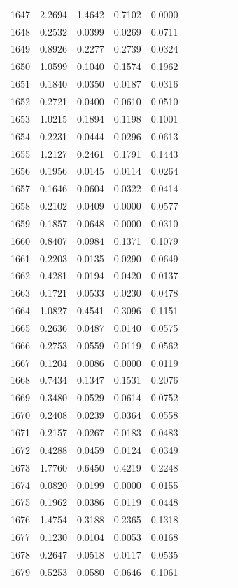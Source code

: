 \begin{table}
\begin{tabular}{cccccccccc}
1647& 2.2694& 1.4642& 0.7102& 0.0000\\ 
1648& 0.2532& 0.0399& 0.0269& 0.0711\\ 
1649& 0.8926& 0.2277& 0.2739& 0.0324\\ 
1650& 1.0599& 0.1040& 0.1574& 0.1962\\ 
1651& 0.1840& 0.0350& 0.0187& 0.0316\\ 
1652& 0.2721& 0.0400& 0.0610& 0.0510\\ 
1653& 1.0215& 0.1894& 0.1198& 0.1001\\ 
1654& 0.2231& 0.0444& 0.0296& 0.0613\\ 
1655& 1.2127& 0.2461& 0.1791& 0.1443\\ 
1656& 0.1956& 0.0145& 0.0114& 0.0264\\ 
1657& 0.1646& 0.0604& 0.0322& 0.0414\\ 
1658& 0.2102& 0.0409& 0.0000& 0.0577\\ 
1659& 0.1857& 0.0648& 0.0000& 0.0310\\ 
1660& 0.8407& 0.0984& 0.1371& 0.1079\\ 
1661& 0.2203& 0.0135& 0.0290& 0.0649\\ 
1662& 0.4281& 0.0194& 0.0420& 0.0137\\ 
1663& 0.1721& 0.0533& 0.0230& 0.0478\\ 
1664& 1.0827& 0.4541& 0.3096& 0.1151\\ 
1665& 0.2636& 0.0487& 0.0140& 0.0575\\ 
1666& 0.2753& 0.0559& 0.0119& 0.0562\\ 
1667& 0.1204& 0.0086& 0.0000& 0.0119\\ 
1668& 0.7434& 0.1347& 0.1531& 0.2076\\ 
1669& 0.3480& 0.0529& 0.0614& 0.0752\\ 
1670& 0.2408& 0.0239& 0.0364& 0.0558\\ 
1671& 0.2157& 0.0267& 0.0183& 0.0483\\ 
1672& 0.4288& 0.0459& 0.0124& 0.0349\\ 
1673& 1.7760& 0.6450& 0.4219& 0.2248\\ 
1674& 0.0820& 0.0199& 0.0000& 0.0155\\ 
1675& 0.1962& 0.0386& 0.0119& 0.0448\\ 
1676& 1.4754& 0.3188& 0.2365& 0.1318\\ 
1677& 0.1230& 0.0104& 0.0053& 0.0168\\ 
1678& 0.2647& 0.0518& 0.0117& 0.0535\\ 
1679& 0.5253& 0.0580& 0.0646& 0.1061\\ 

\end{tabular}
\end{table}
